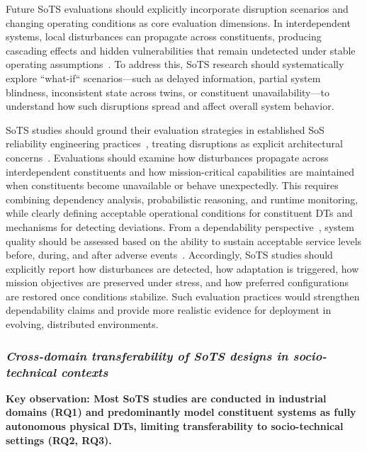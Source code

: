 Future SoTS evaluations should explicitly incorporate disruption scenarios and changing operating conditions as core evaluation dimensions. In interdependent systems, local disturbances can propagate across constituents, producing cascading effects and hidden vulnerabilities that remain undetected under stable operating assumptions~\cite{eusgeld2011system}. To address this, SoTS research should systematically explore ``what-if`` scenarios---such as delayed information, partial system blindness, inconsistent state across twins, or constituent unavailability---to understand how such disruptions spread and affect overall system behavior.

SoTS studies should ground their evaluation strategies in established SoS reliability engineering practices~\cite{ferreira2021reliability}, treating disruptions as explicit architectural concerns~\cite{ferreira2024framework}. Evaluations should examine how disturbances propagate across interdependent constituents and how mission-critical capabilities are maintained when constituents become unavailable or behave unexpectedly. This requires combining dependency analysis, probabilistic reasoning, and runtime monitoring, while clearly defining acceptable operational conditions for constituent DTs and mechanisms for detecting deviations. From a dependability perspective~\cite{avizienis2004basic}, system quality should be assessed based on the ability to sustain acceptable service levels before, during, and after adverse events~\cite{bukowski2016system}. Accordingly, SoTS studies should explicitly report how disturbances are detected, how adaptation is triggered, how mission objectives are preserved under stress, and how preferred configurations are restored once conditions stabilize. Such evaluation practices would strengthen dependability claims and provide more realistic evidence for deployment in evolving, distributed environments.


\subsubsection{\textit{Cross-domain transferability of SoTS designs in socio-technical contexts}}

\textbf{Key observation: Most SoTS studies are conducted in industrial domains (RQ1) and predominantly model constituent systems as fully autonomous physical DTs, limiting transferability to socio-technical settings (RQ2, RQ3).}

